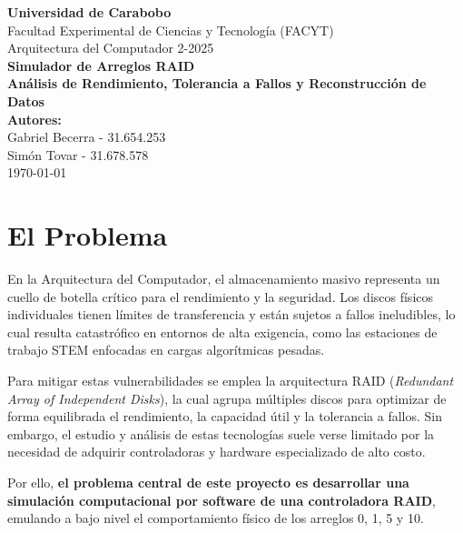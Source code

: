 \documentclass[12pt, a4paper]{article}
\begin{document}
\begin{titlepage}
    \centering
    \vspace*{2cm}
    
    {\Large \textbf{Universidad de Carabobo}}\\[0.5cm]
    {\large Facultad Experimental de Ciencias y Tecnología (FACYT)}\\[0.5cm]
    {\large Arquitectura del Computador 2-2025}\\[3cm]
    
    {\Huge \textbf{Simulador de Arreglos RAID}}\\[0.5cm]
    {\large \textbf{Análisis de Rendimiento, Tolerancia a Fallos y Reconstrucción de Datos}}\\[3cm]
    
    \textbf{Autores:}\\[0.2cm]
    Gabriel Becerra - 31.654.253 \\
    Simón Tovar - 31.678.578 \\[2cm]
    
    \vfill
    {\large \today}
\end{titlepage}

\newpage
\tableofcontents
\newpage

\section{El Problema}

En la Arquitectura del Computador, el almacenamiento masivo representa un cuello de botella crítico para el rendimiento y la seguridad. Los discos físicos individuales tienen límites de transferencia y están sujetos a fallos ineludibles, lo cual resulta catastrófico en entornos de alta exigencia, como las estaciones de trabajo STEM enfocadas en cargas algorítmicas pesadas.

Para mitigar estas vulnerabilidades se emplea la arquitectura RAID (\textit{Redundant Array of Independent Disks}), la cual agrupa múltiples discos para optimizar de forma equilibrada el rendimiento, la capacidad útil y la tolerancia a fallos. Sin embargo, el estudio y análisis de estas tecnologías suele verse limitado por la necesidad de adquirir controladoras y hardware especializado de alto costo.

Por ello, \textbf{el problema central de este proyecto es desarrollar una simulación computacional por software de una controladora RAID}, emulando a bajo nivel el comportamiento físico de los arreglos 0, 1, 5 y 10. 
\end{document}
